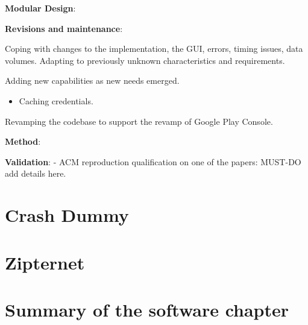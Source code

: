 \textbf{Modular Design}:

\textbf{Revisions and maintenance}:

Coping with changes to the implementation, the GUI, errors, timing issues, data volumes. Adapting to previously unknown characteristics and requirements. 

Adding new capabilities as new needs emerged.
\begin{itemize}
    \item Caching credentials. 
\end{itemize}

Revamping the codebase to support the revamp of Google Play Console.

\textbf{Method}:


\textbf{Validation}:
- ACM reproduction qualification on one of the papers: MUST-DO add details here. 

\section{Crash Dummy}


\section{Zipternet}


\section{Summary of the software chapter}